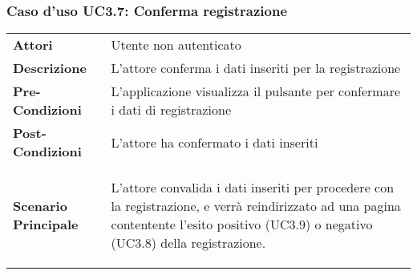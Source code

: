 \subsubsection{Caso d'uso UC3.7:  Conferma registrazione}
\label{UC3_7}

\begin{longtable}{ l | p{11cm}}
	\hline
	\rowcolor{Gray}
	 \multicolumn{2}{c}{UC3.7 - Conferma registrazione} \\
	 \hline
	\textbf{Attori} & Utente non autenticato \\
	\textbf{Descrizione} & L'attore conferma i dati inseriti per la registrazione  \\
	\textbf{Pre-Condizioni} & L'applicazione visualizza il pulsante per confermare i dati di registrazione \\
	\textbf{Post-Condizioni} & L'attore ha confermato i dati inseriti \\
	\textbf{Scenario Principale} & \begin{enumerate*}[label=(\arabic*.),itemjoin={\newline}]
		\item L'attore convalida i dati inseriti per procedere con la registrazione, e verrà reindirizzato ad una pagina contentente l'esito positivo (UC3.9) o negativo (UC3.8) della registrazione.
	\end{enumerate*}\\
\end{longtable}